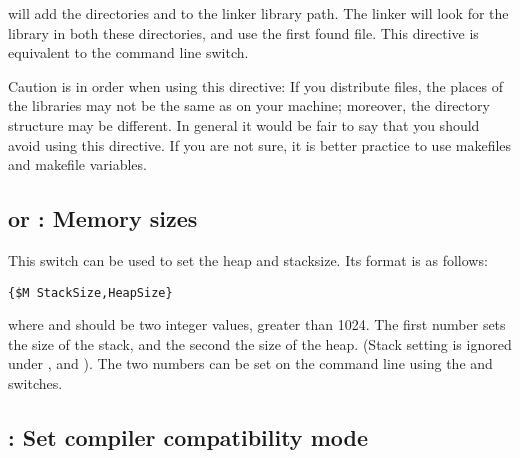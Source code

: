 will add the directories  and  to
the linker library path. The linker will look for the library 
in both these directories, and use the first found file. This directive is
equivalent to the  command line switch.

Caution is in order when using this directive: If you distribute files, the
places of the libraries may not be the same as on your machine; moreover, the
directory structure may be different. In general it would be fair to say
that you should avoid using this directive. If you are not sure, it is better
practice to use makefiles and makefile variables.

\subsection{ or  : Memory sizes}

This switch can be used to set the heap and stacksize. Its format is as
follows:
\begin{verbatim}
{$M StackSize,HeapSize}
\end{verbatim}
where  and  should be two integer values,
greater than 1024. The first number sets the size of the stack, and the
second the size of the heap. (Stack setting is ignored under \linux, \netbsd and \freebsd).
The two numbers can be set on the command line using the 
and  switches.

\subsection{ : Set compiler compatibility mode}

